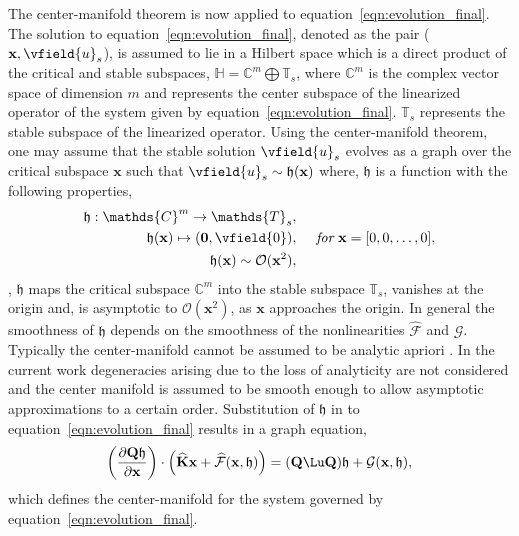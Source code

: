 The center-manifold theorem is now applied to equation~\eqref{eqn:evolution_final}. 	The solution to equation~\eqref{eqn:evolution_final}, denoted as the pair ($\mathbf{x},\vfield{u}_{s}$), is assumed to lie in a Hilbert space which is a direct product of the critical and stable subspaces, $\mathds{H} = \mathds{C}^{m} \bigoplus \mathds{T}_{s}$, where $\mathds{C}^{m}$ is the complex vector space of dimension $m$ and represents the center subspace of the linearized operator of the system given by equation~\eqref{eqn:evolution_final}. $\mathds{T}_{s}$ represents the stable subspace of the linearized operator. 
%
Using the center-manifold theorem, one may assume that the stable solution $\vfield{u}_{s}$ evolves as a graph over the critical subspace $\mathbf{x}$ such that $\vfield{u}_{s} \sim \mathfrak{h}(\mathbf{x})$ where, $\mathfrak{h}$ is a function with the following properties,
\begin{eqnarray}
	\label{eqn:CM_approx_properties}
	\mathfrak{h}: \mathds{C}^{m} \to \mathds{T}_{s}, & \nonumber \\
	\mathfrak{h}(\mathbf{x}) \mapsto (\boldsymbol{0},\vfield{0}), & \hspace{5mm} \textit{for}\ \mathbf{x} = [0,0,\ldots,0] , \nonumber \\
	\mathfrak{h}(\mathbf{x}) \sim \mathcal{O}(\mathbf{x}^{2}), & \nonumber
\end{eqnarray}
\ie, $\mathfrak{h}$ maps the critical subspace $\mathds{C}^{m}$ into the stable subspace $\mathds{T}_{s}$, vanishes at the origin and, is asymptotic to $\mathcal{O}(\mathbf{x}^{2})$, as $\mathbf{x}$ approaches the origin. 
In general the smoothness of $\mathfrak{h}$ depends on the smoothness of the nonlinearities $\mathcal{\widehat{F}}$ and $\mathcal{G}$. Typically the center-manifold cannot be assumed to be analytic apriori \citep{carr82,sijbrand85}. In the current work degeneracies arising due to the loss of analyticity are not considered and the center manifold is assumed to be smooth enough to allow asymptotic approximations to a certain order. Substitution of $\mathfrak{h}$ in to equation~\eqref{eqn:evolution_final} results in a graph equation,
\begin{align}
	\label{eqn:graph_equation}
	\left(\frac{\partial \mathbf{Q}\mathfrak{h}}{\partial \mathbf{x}}\right)\cdot \left(\mathbf{\widehat{K}}\mathbf{x} + \mathcal{\widehat{F}}(\mathbf{x},\mathfrak{h}) \right) = (\mathbf{Q}\Lu\mathbf{Q})\mathfrak{h} + \mathcal{G}(\mathbf{x},\mathfrak{h}),
\end{align}
which defines the center-manifold for the system governed by equation~\eqref{eqn:evolution_final}. 


